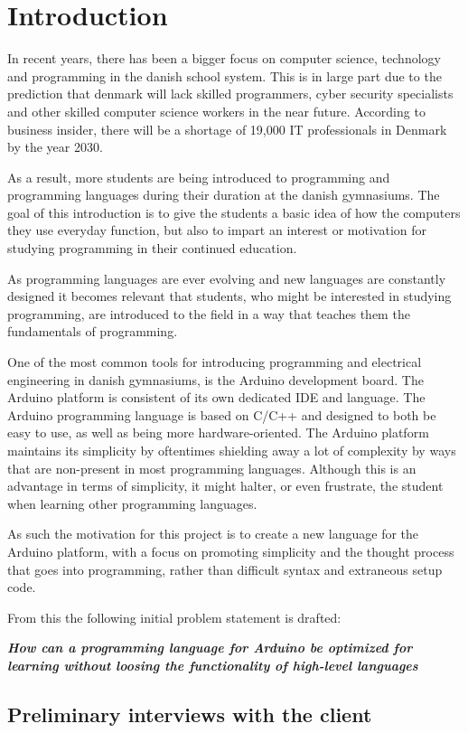 
\chapter{Introduction}

In recent years, there has been a bigger focus on computer science, technology and programming in the danish school system.
This is in large part due to the prediction that denmark will lack skilled programmers, cyber security specialists and other skilled computer science workers in the near future.
According to business insider, there will be a shortage of 19,000 IT professionals in Denmark by the year 2030.\cite{ITLackDK}

As a result, more students are being introduced to programming and programming languages during their duration at the
danish gymnasiums. 
The goal of this introduction is to give the students a basic idea of how the computers they use everyday function, but also to impart an interest or motivation for studying programming in their continued education.

As programming languages are ever evolving and new languages are constantly designed it becomes relevant
that students, who might be interested in studying programming, are introduced to the field in a way that
teaches them the fundamentals of programming.

One of the most common tools for introducing programming and electrical engineering in danish gymnasiums, is
the Arduino development board. The Arduino platform is consistent of its own dedicated IDE and language.
The Arduino programming language is based on C/C++ and designed to both be easy to use, as well as being
more hardware-oriented.\cite{ArFAQ}
The Arduino platform maintains its simplicity by oftentimes shielding away a lot of complexity by ways
that are non-present in most programming languages.
Although this is an advantage in terms of simplicity, it might halter, or even frustrate, the student when learning other programming
languages.

As such the motivation for this project is to create a new language for the Arduino platform, with a focus on promoting simplicity and the thought process that goes into programming, rather than difficult syntax and extraneous setup code.


From this the following initial problem statement is drafted:

\centering\textit{\textbf{How can a programming language for Arduino be optimized for learning without 
loosing the functionality of high-level languages}}
\section{Preliminary interviews with the client}
